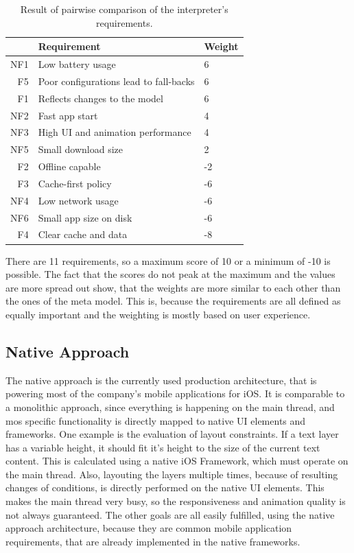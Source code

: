 \begin{table}[h]
	\begin{center}
		\begin{tabular}{r|l|l}
			& Requirement                               & Weight \\ \hline
			NF1 & Low battery usage                                   & 6     \\
			F5 & Poor configurations lead to fall-backs                     & 6     \\
			F1 & Reflects changes to the model                & 6     \\
			NF2 & Fast app start    & 4     \\
			NF3 & High UI and animation performance         & 4    \\
			NF5 & Small download size    & 2     \\
			F2 & Offline capable                      & -2    \\
			F3 & Cache-first policy        & -6    \\
			NF4 & Low network usage             & -6    \\
			NF6 & Small app size on disk       & -6   \\
			F4 & Clear cache and data       & -8   
			\\ \hline
		\end{tabular}
	\end{center}
	\caption{Result of pairwise comparison of the interpreter's requirements.}
	\label{table:pairwisecomparisoninterpreterresult}
\end{table}

There are 11 requirements, so a maximum score of 10 or a minimum of -10 is possible.
The fact that the scores do not peak at the maximum and the values are more spread out show, that the weights are more similar to each other than the ones of the meta model.
This is, because the requirements are all defined as equally important and the weighting is mostly based on user experience.

\subsection{Native Approach}

The native approach is the currently used production architecture, that is powering most of the company's mobile applications for iOS.
It is comparable to a monolithic approach, since everything is happening on the main thread, and mos specific functionality is directly mapped to native \ac{UI} elements and frameworks.
One example is the evaluation of layout constraints.
If a text layer has a variable height, it should fit it's height to the size of the current text content.
This is calculated using a native iOS Framework, which must operate on the main thread.
Also, layouting the layers multiple times, because of resulting changes of conditions, is directly performed on the native \ac{UI} elements.
This makes the main thread very busy, so the responsiveness and animation quality is not always guaranteed.
The other goals are all easily fulfilled, using the native approach architecture, because they are common mobile application requirements, that are already implemented in the native frameworks.

